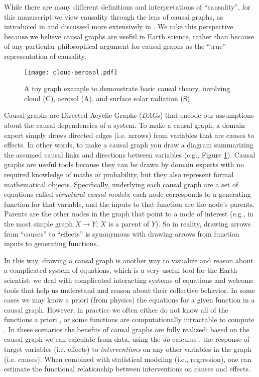 \documentclass[12pt]{article}
\begin{document}
While there are many different definitions and interpretations of
``causality'', for this manuscript we view causality through the lens
of causal graphs, as introduced in \citet{pearl1995causal} and
discussed more extensively in \citet{pearl2009causality}. We take this
perspective because we believe causal graphs are useful in Earth
science, rather than because of any particular philosophical argument
for causal graphs as the ``true'' representation of causality.

\begin{figure} \texttt{[image: cloud-aerosol.pdf]}
  \caption{A toy graph example to demonstrate basic causal theory,
    involving cloud (C), aerosol (A), and surface solar radiation
    (S).}
  \label{fig:toy}
\end{figure}

Causal graphs are Directed Acyclic Graphs (\emph{DAG}s) that encode
our assumptions about the causal dependencies of a system. To make a
causal graph, a domain expert simply draws directed edges
(i.e. arrows) from variables that are causes to effects. In other
words, to make a causal graph you draw a diagram summarizing the
assumed causal links and directions between variables (e.g., Figure
\ref{fig:toy}). Causal graphs are useful tools because they can be
drawn by domain experts with no required knowledge of maths or
probability, but they also represent formal mathematical
objects. Specifically, underlying each causal graph are a set of
equations called \emph{structural causal models}: each node
corresponds to a generating function for that variable, and the inputs
to that function are the node's parents. Parents are the other nodes
in the graph that point to a node of interest (e.g., in the most
simple graph $X \to Y$; $X$ is a parent of $Y$). So in reality,
drawing arrows from ``causes'' to ``effects'' is synonymous with
drawing arrows from function inputs to generating functions.

In this way, drawing a causal graph is another way to visualize and
reason about a complicated system of equations, which is a very useful
tool for the Earth scientist: we deal with complicated interacting
systems of equations and welcome tools that help us understand and
reason about their collective behavior. In some cases we may know a
priori (from physics) the equations for a given function in a causal
graph. However, in practice we often either do not know all of the
functions a priori \citep[e.g., plant stomata response to
VPD;][]{massmann2019, zhou2019arid, zhou2019feedback, grossiord2020},
or some functions are computationally intractable to compute
\citep[e.g., turbulence, moist convection, and cloud microphysics in
large scale models;][]{zadra2018,gentine2018}. In these scenarios the
benefits of causal graphs are fully realized: based on the causal
graph we can calculate from data, using the \textit{do-}calculus
\citep{pearl-1994-do-calculus}, the response of target variables
(i.e. effects) to \textit{interventions} on any other variables in the
graph (i.e. causes). When combined with statistical modeling (i.e.,
regression), one can estimate the functional relationship between
interventions on causes and effects.
\end{document}
